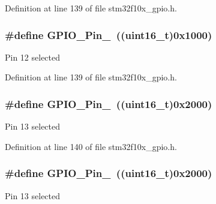 Definition at line 139 of file stm32f10x\+\_\+gpio.\+h.

\subsubsection[{\texorpdfstring{G\+P\+I\+O\+\_\+\+Pin\+\_\+12}{GPIO_Pin_12}}]{\setlength{\rightskip}{0pt plus 5cm}\#define G\+P\+I\+O\+\_\+\+Pin\+\_~(({\bf uint16\+\_\+t})0x1000)}\hypertarget{group___g_p_i_o__pins__define_gada91257dcaab2c86f75fbd8e4b52b98c}{}\label{group___g_p_i_o__pins__define_gada91257dcaab2c86f75fbd8e4b52b98c}
Pin 12 selected 

Definition at line 139 of file stm32f10x\+\_\+gpio.\+h.

\subsubsection[{\texorpdfstring{G\+P\+I\+O\+\_\+\+Pin\+\_\+13}{GPIO_Pin_13}}]{\setlength{\rightskip}{0pt plus 5cm}\#define G\+P\+I\+O\+\_\+\+Pin\+\_~(({\bf uint16\+\_\+t})0x2000)}\hypertarget{group___g_p_i_o__pins__define_ga4155a41c433f3657b9c79cfbd4240966}{}\label{group___g_p_i_o__pins__define_ga4155a41c433f3657b9c79cfbd4240966}
Pin 13 selected 

Definition at line 140 of file stm32f10x\+\_\+gpio.\+h.

\subsubsection[{\texorpdfstring{G\+P\+I\+O\+\_\+\+Pin\+\_\+13}{GPIO_Pin_13}}]{\setlength{\rightskip}{0pt plus 5cm}\#define G\+P\+I\+O\+\_\+\+Pin\+\_~(({\bf uint16\+\_\+t})0x2000)}\hypertarget{group___g_p_i_o__pins__define_ga4155a41c433f3657b9c79cfbd4240966}{}\label{group___g_p_i_o__pins__define_ga4155a41c433f3657b9c79cfbd4240966}
Pin 13 selected 

